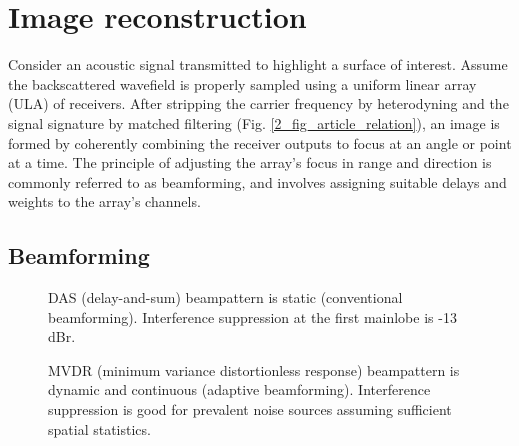 {\section{Image reconstruction}\label{methods}

Consider an acoustic signal transmitted to highlight a surface of interest. Assume the backscattered wavefield is properly sampled using a uniform linear array (ULA) of receivers. After stripping the carrier frequency by heterodyning and the signal signature by matched filtering (Fig. \ref{2_fig_article_relation}), an image is formed by coherently combining the receiver outputs to focus at an angle or point at a time. The principle of adjusting the array's focus in range and direction is commonly referred to as beamforming, and involves assigning suitable delays and weights to the array's channels.



\subsection{Beamforming}

\begin{figure}[tp]
\caption{DAS (delay-and-sum) beampattern is static (conventional beamforming). Interference suppression at the first mainlobe is -13\,dBr.}%
\label{2_fig_scenario_das}
\end{figure}

\begin{figure}[tp]
\caption{MVDR (minimum variance distortionless response) beampattern is dynamic and continuous (adaptive beamforming). Interference suppression is good for prevalent noise sources assuming sufficient spatial statistics.}%
\label{2_fig_scenario_mvdr}
\end{figure}

}
